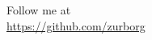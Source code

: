 
\begin{frame}[fragile]

\begin{center}

    \huge{
        Follow me at\\
        \url{https://github.com/zurborg}
    }

\end{center}

\end{frame}




